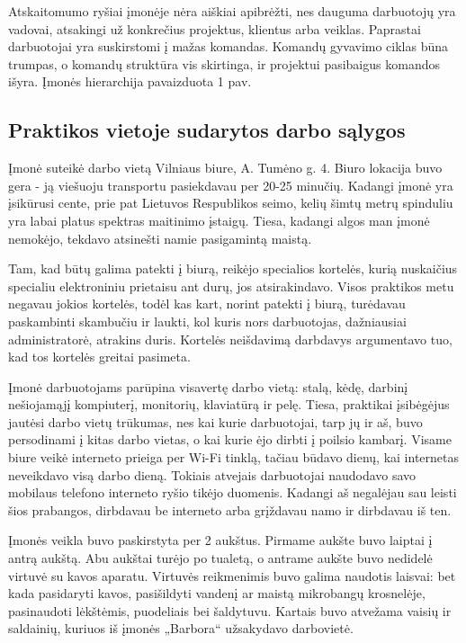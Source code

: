 \documentclass{VUMIFPSkursinis}
\begin{document}
Atskaitomumo ryšiai įmonėje nėra aiškiai apibrėžti, nes dauguma darbuotojų yra vadovai, atsakingi už konkrečius projektus, klientus arba veiklas. Paprastai darbuotojai yra suskirstomi į mažas komandas. Komandų gyvavimo ciklas būna trumpas, o komandų struktūra vis skirtinga, ir projektui pasibaigus komandos išyra. Įmonės hierarchija pavaizduota 1 pav.

\subsection{Praktikos vietoje sudarytos darbo sąlygos}
Įmonė suteikė darbo vietą Vilniaus biure, A. Tumėno g. 4. Biuro lokacija buvo gera - ją viešuoju transportu  pasiekdavau per 20-25 minučių. Kadangi įmonė yra įsikūrusi cente, prie pat Lietuvos Respublikos seimo, kelių šimtų metrų spinduliu yra labai platus spektras maitinimo įstaigų. Tiesa, kadangi algos man įmonė nemokėjo, tekdavo atsinešti namie pasigamintą maistą.

Tam, kad būtų galima patekti į biurą, reikėjo specialios kortelės, kurią nuskaičius specialiu elektroniniu prietaisu ant durų, jos atsirakindavo. Visos praktikos metu negavau jokios kortelės, todėl kas kart, norint patekti į biurą, turėdavau paskambinti skambučiu ir laukti, kol kuris nors darbuotojas, dažniausiai administratorė, atrakins duris. Kortelės neišdavimą darbdavys argumentavo tuo, kad tos kortelės greitai pasimeta.

Įmonė darbuotojams parūpina visavertę darbo vietą: stalą, kėdę, darbinį nešiojamąjį kompiuterį, monitorių, klaviatūrą ir pelę. Tiesa, praktikai įsibėgėjus jautėsi darbo vietų trūkumas, nes kai kurie darbuotojai, tarp jų ir aš, buvo persodinami į kitas darbo vietas, o kai kurie ėjo dirbti į poilsio kambarį. Visame biure veikė interneto prieiga per Wi-Fi tinklą, tačiau būdavo dienų, kai internetas neveikdavo visą darbo dieną. Tokiais atvejais darbuotojai naudodavo savo mobilaus telefono interneto ryšio tikėjo duomenis. Kadangi aš negalėjau sau leisti šios prabangos, dirbdavau be interneto arba grįždavau namo ir dirbdavau iš ten.

Įmonės veikla buvo paskirstyta per 2 aukštus. Pirmame aukšte buvo laiptai į antrą aukštą. Abu aukštai turėjo po tualetą, o antrame aukšte buvo nedidelė virtuvė su kavos aparatu. Virtuvės reikmenimis buvo galima naudotis laisvai: bet kada pasidaryti kavos, pasišildyti vandenį ar maistą mikrobangų krosnelėje, pasinaudoti lėkštėmis, puodeliais bei šaldytuvu. Kartais buvo atvežama vaisių ir saldainių, kuriuos iš įmonės „Barbora“ užsakydavo darbovietė.
\end{document}
